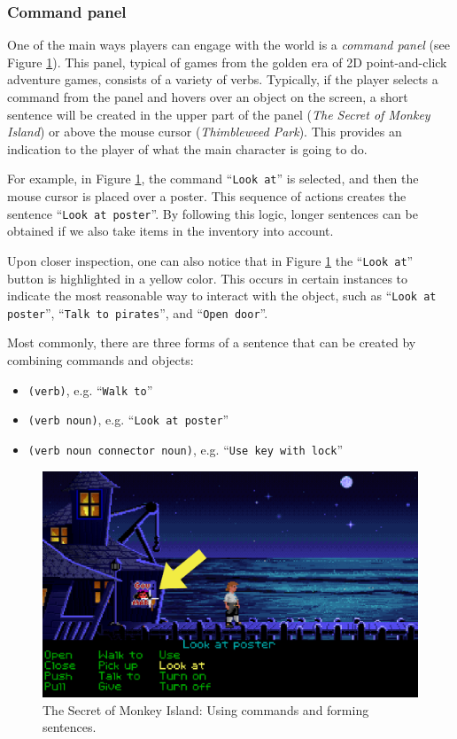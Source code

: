 \subsubsection{Command panel}
One of the main ways players can engage with the world is a \textit{command panel} (see Figure \ref{fig:C-TSoMI}). This panel, typical of games from the golden era of 2D point-and-click adventure games, consists of a variety of verbs. Typically, if the player selects a command from the panel and hovers over an object on the screen, a short sentence will be created in the upper part of the panel (\textit{The Secret of Monkey Island}) or above the mouse cursor (\textit{Thimbleweed Park}). This provides an indication to the player of what the main character is going to do. 

For example, in Figure \ref{fig:C-TSoMI}, the command “\texttt{Look at}” is selected, and then the mouse cursor is placed over a poster. This sequence of actions creates the sentence “\texttt{Look at poster}”. By following this logic, longer sentences can be obtained if we also take items in the inventory into account. 

Upon closer inspection, one can also notice that in Figure \ref{fig:C-TSoMI} the “\texttt{Look at}” button is highlighted in a yellow color. This occurs in certain instances to indicate the most reasonable way to interact with the object, such as “\texttt{Look at poster}”, “\texttt{Talk to pirates}”, and “\texttt{Open door}”.

Most commonly, there are three forms of a sentence that can be created by combining commands and objects:
\begin{itemize}
    \item \verb|(verb)|, e.g. “\texttt{Walk to}”
    \item \verb|(verb noun)|, e.g. “\texttt{Look at poster}”
    \item \verb|(verb noun connector noun)|, e.g. “\texttt{Use key with lock}”
\end{itemize}

\begin{figure}[H]
\centering
\includegraphics[width=.8\linewidth]{img/C-TSoMI.png}
\caption{The Secret of Monkey Island: Using commands and forming sentences.}
\label{fig:C-TSoMI}
\end{figure}
 
